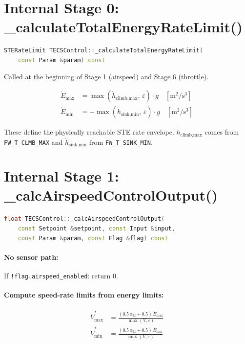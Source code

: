 \documentclass[12pt,a4paper]{article}
\begin{document}
\section{Internal Stage 0: \_calculateTotalEnergyRateLimit()}

\begin{lstlisting}[language=C++]
STERateLimit TECSControl::_calculateTotalEnergyRateLimit(
    const Param &param) const
\end{lstlisting}

Called at the beginning of Stage 1 (airspeed) and Stage 6 (throttle).

\begin{align}
  \dot{E}_{\max} &= \max(\dot{h}_{\text{climb,max}},\,\varepsilon) \cdot g \quad [\text{m}^2/\text{s}^3] \\
  \dot{E}_{\min} &= -\max(\dot{h}_{\text{sink,min}},\,\varepsilon) \cdot g \quad [\text{m}^2/\text{s}^3]
\end{align}

These define the physically reachable STE rate envelope.
$\dot{h}_{\text{climb,max}}$ comes from \texttt{FW\_T\_CLMB\_MAX} and
$\dot{h}_{\text{sink,min}}$ from \texttt{FW\_T\_SINK\_MIN}.

\section{Internal Stage 1: \_calcAirspeedControlOutput()}

\begin{lstlisting}[language=C++]
float TECSControl::_calcAirspeedControlOutput(
    const Setpoint &setpoint, const Input &input,
    const Param &param, const Flag &flag) const
\end{lstlisting}

\paragraph{No sensor path:} If \texttt{!flag.airspeed\_enabled}: return $0$.

\paragraph{Compute speed-rate limits from energy limits:}
\begin{align}
  \dot{V}^*_{\max} &= \frac{(0.5\,\alpha_{\text{fd}} + 0.5)\,\dot{E}_{\max}}{\max(V,\varepsilon)} \\
  \dot{V}^*_{\min} &= \frac{(0.5\,\alpha_{\text{fd}} + 0.5)\,\dot{E}_{\min}}{\max(V,\varepsilon)}
\end{align}
\end{document}
